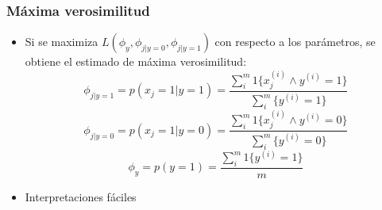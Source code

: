 \documentclass{beamer}
\begin{document}
\begin{frame}
\frametitle{Máxima verosimilitud}

\begin{itemize}
\item Si se maximiza $L(\phi_{y},\phi_{j\vert y=0}, \phi_{j\vert y=1})$ con respecto a los parámetros, se obtiene el estimado de máxima verosimilitud:
\begin{equation*}
\phi_{j\vert y=1}=p(x_{j}=1\vert y=1 )= \frac{\sum_i^m 1 \lbrace x_j^{(i)} \wedge y^{(i)}=1 \rbrace  }{\sum_i^m  \lbrace  y^{(i)}=1 \rbrace }
\end{equation*}
\begin{equation*}
\phi_{j\vert y=0}=p(x_{j}=1\vert y=0 )= \frac{\sum_i^m  1 \lbrace x_j^{(i)} \wedge y^{(i)}=0 \rbrace  }{\sum_i^m  \lbrace  y^{(i)}=0 \rbrace }
\end{equation*}
\begin{equation*}
\phi_{y}=p(y=1 )= \frac{\sum_i^m  1 \lbrace y^{(i)}=1 \rbrace  }{m}
\end{equation*}

\item Interpretaciones fáciles 

\end{itemize}

\end{frame}%
\end{document}
